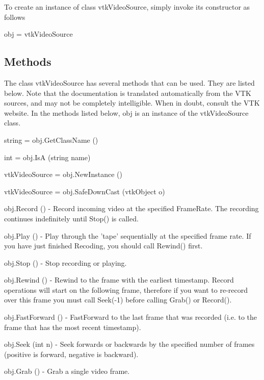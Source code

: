 To create an instance of class vtk\-Video\-Source, simply invoke its constructor as follows \begin{DoxyVerb}  obj = vtkVideoSource
\end{DoxyVerb}
 \hypertarget{vtkwidgets_vtkxyplotwidget_Methods}{}\subsection{Methods}\label{vtkwidgets_vtkxyplotwidget_Methods}
The class vtk\-Video\-Source has several methods that can be used. They are listed below. Note that the documentation is translated automatically from the V\-T\-K sources, and may not be completely intelligible. When in doubt, consult the V\-T\-K website. In the methods listed below, {\ttfamily obj} is an instance of the vtk\-Video\-Source class. 
\begin{DoxyItemize}
\item {\ttfamily string = obj.\-Get\-Class\-Name ()}  
\item {\ttfamily int = obj.\-Is\-A (string name)}  
\item {\ttfamily vtk\-Video\-Source = obj.\-New\-Instance ()}  
\item {\ttfamily vtk\-Video\-Source = obj.\-Safe\-Down\-Cast (vtk\-Object o)}  
\item {\ttfamily obj.\-Record ()} -\/ Record incoming video at the specified Frame\-Rate. The recording continues indefinitely until Stop() is called.  
\item {\ttfamily obj.\-Play ()} -\/ Play through the 'tape' sequentially at the specified frame rate. If you have just finished Recoding, you should call Rewind() first.  
\item {\ttfamily obj.\-Stop ()} -\/ Stop recording or playing.  
\item {\ttfamily obj.\-Rewind ()} -\/ Rewind to the frame with the earliest timestamp. Record operations will start on the following frame, therefore if you want to re-\/record over this frame you must call Seek(-\/1) before calling Grab() or Record().  
\item {\ttfamily obj.\-Fast\-Forward ()} -\/ Fast\-Forward to the last frame that was recorded (i.\-e. to the frame that has the most recent timestamp).  
\item {\ttfamily obj.\-Seek (int n)} -\/ Seek forwards or backwards by the specified number of frames (positive is forward, negative is backward).  
\item {\ttfamily obj.\-Grab ()} -\/ Grab a single video frame.  

\end{DoxyItemize}
